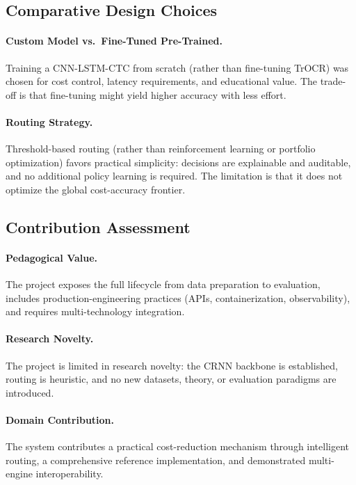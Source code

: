\documentclass[12pt,a4paper]{article}
\begin{document}
\subsection{Comparative Design Choices}

\paragraph{Custom Model vs.\ Fine-Tuned Pre-Trained.}
Training a CNN-LSTM-CTC from scratch (rather than fine-tuning TrOCR)
was chosen for cost control, latency requirements, and educational
value. The trade-off is that fine-tuning might yield higher accuracy
with less effort.

\paragraph{Routing Strategy.}
Threshold-based routing (rather than reinforcement learning or
portfolio optimization) favors practical simplicity: decisions are
explainable and auditable, and no additional policy learning is
required. The limitation is that it does not optimize the global
cost-accuracy frontier.

\subsection{Contribution Assessment}

\paragraph{Pedagogical Value.}
The project exposes the full lifecycle from data preparation to
evaluation, includes production-engineering practices (APIs,
containerization, observability), and requires multi-technology
integration.

\paragraph{Research Novelty.}
The project is limited in research novelty: the CRNN backbone is
established, routing is heuristic, and no new datasets, theory, or
evaluation paradigms are introduced.

\paragraph{Domain Contribution.}
The system contributes a practical cost-reduction mechanism through
intelligent routing, a comprehensive reference implementation, and
demonstrated multi-engine interoperability.
\end{document}
